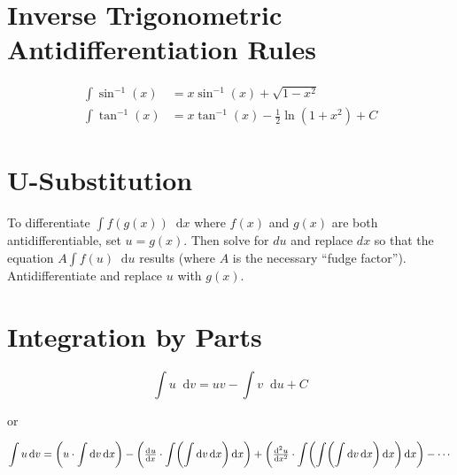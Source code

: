 \documentclass[12pt]{article}
\DeclarePairedDelimiter\paren{(}{)}
\newcommand*{\asin}{\sin^{-1}}
\newcommand*{\atan}{\tan^{-1}}
\newcommand*{\dd}[3][]{\tfrac{\mathrm{d}^{#1}#2}{\mathrm{d}#3^{#1}}}
\newcommand*{\D}[1]{\mathop{}\!\mathrm{d}#1}
\newcommand*{\fixmath}{%
  \makebox{}\vspace{\glueexpr-\baselineskip-\abovedisplayskip}}
\newenvironment{fixaskip}{\setlength{\abovedisplayskip}{0pt}\fixmath%
  \ignorespaces}{\ignorespacesafterend}
\newenvironment{fixbskip}{\setlength{\belowdisplayskip}{0pt}\ignorespaces}%
  {\ignorespacesafterend}
\newenvironment{fixskip}{\setlength{\abovedisplayskip}{0pt}%
  \setlength{\belowdisplayskip}{0pt}\fixmath\ignorespaces}%
  {\ignorespacesafterend}
\begin{document}
\section*{Inverse Trigonometric Antidifferentiation Rules}
\begin{fixskip}
  \begin{align*}
    \int \asin(x) &= x\asin(x) + \sqrt{1-x^2}\\
    \int \atan(x) &= x\atan(x) - \frac{1}{2} \ln(1 + x^2) + C
  \end{align*}
\end{fixskip}
\section*{U-Substitution}
To differentiate \(\int f(g(x)) \D{x}\) where \(f(x)\) and \(g(x)\) are both
antidifferentiable, set \(u = g(x)\). Then solve for \(du\) and replace \(dx\)
so that the equation \(A\int f(u) \D{u}\) results (where \(A\) is the necessary
``fudge factor''). Antidifferentiate and replace \(u\) with \(g(x)\).
\section*{Integration by Parts}
\begin{fixaskip}
  \[
    \int u \D{v} = uv - \int v \D{u} + C
  \]
\end{fixaskip}

or

\begin{fixbskip}
  \[
    \int u \D{v} = \paren*{u \cdot \int \D{v} \D{x}}
      - \paren*{\dd{u}{x} \cdot \int \paren*{ \int \D{v} \D{x}} \D{x}}
      + \paren*{\dd[2]{u}{x} \cdot \int \paren*{\int \paren*{\int \D{v} \D{x}}
        \D{x}} \D{x}} - \cdots
  \]
\end{fixbskip}
\end{document}
